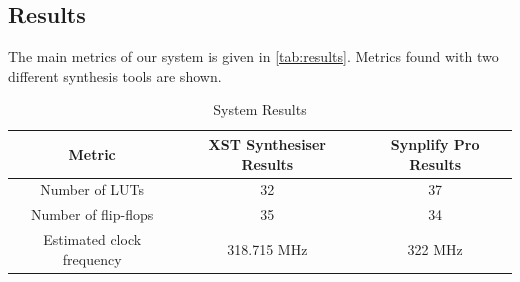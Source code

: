 \subsection{Results}

The main metrics of our system is given in
\autoref{tab:results}. Metrics found with two different synthesis
tools are shown.

\begin{table}[htbp]
  \centering
  \begin{tabular}{|c|c|c|}
    \hline
    \textbf{Metric} & XST Synthesiser Results & Synplify Pro Results \\ \hline
    Number of LUTs & 32 & 37 \\ \hline
    Number of flip-flops & 35 & 34 \\ \hline
    Estimated clock frequency & 318.715 MHz & 322 MHz \\ \hline
  \end{tabular}
  \caption{System Results}
  \label{tab:results}
\end{table}
